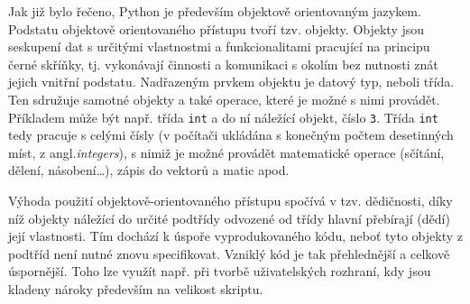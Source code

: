 \documentclass[a4paper, 12pt]{article}
\begin{document}
\noindent Jak již bylo řečeno, Python je především objektově orientovaným jazykem. Podstatu objektově orientovaného přístupu tvoří tzv. objekty. Objekty jsou seskupení dat s určitými vlastnostmi a funkcionalitami pracující na principu černé skříňky, tj. vykonávají činnosti a komunikaci s okolím bez nutnosti znát jejich vnitřní podstatu. Nadřazeným prvkem objektu je datový typ, neboli třída. Ten sdružuje samotné objekty a také operace, které je možné s nimi provádět. Příkladem může být např. třída \texttt{int} a do ní náležící objekt, číslo \texttt{3}. Třída \texttt{int} tedy pracuje s celými čísly (v počítači ukládána s konečným počtem desetinných míst, z angl.\textit{integers}), s nimiž je možné provádět matematické operace (sčítání, dělení, násobení\ldots), zápis do vektorů a matic apod.


Výhoda použití objektově-orientovaného přístupu spočívá v tzv. dědičnosti, díky níž objekty náležící do určité podtřídy odvozené od třídy hlavní přebírají (dědí) její vlastnosti. Tím dochází k úspoře vyprodukovaného kódu, neboť tyto objekty z podtříd není nutné znovu specifikovat. Vzniklý kód je tak přehlednější a celkově úspornější. Toho lze využít např. při tvorbě uživatelských rozhraní, kdy jsou kladeny nároky především na velikost skriptu.
\end{document}
